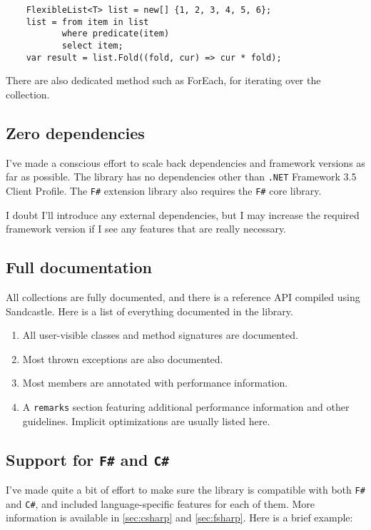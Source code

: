 \documentclass[]{article}
\newcommand{\code}[1]{\mbox{\texttt{#1}}}
\newcommand{\dotnet}{\texttt{.NET}\xspace}
\newcommand{\fsh}{\texttt{F\#}\xspace}
\newcommand{\csh}{\texttt{C\#}\xspace}
\begin{document}
\begin{lstlisting}
	FlexibleList<T> list = new[] {1, 2, 3, 4, 5, 6}; 
	list = from item in list 
		   where predicate(item)
		   select item;
	var result = list.Fold((fold, cur) => cur * fold);
\end{lstlisting}

There are also dedicated method such as ForEach, for iterating over the collection. 

\subsection{Zero dependencies}\label{sec:dependencies}
I've made a conscious effort to scale back dependencies and framework versions as far as possible. The library has no dependencies other than \dotnet Framework 3.5 Client Profile. The \fsh extension library also requires the \fsh core library.

I doubt I'll introduce any external dependencies, but I may increase the required framework version if I see any features that are really necessary.

\subsection{Full documentation}\label{sec:documentation}
All collections are fully documented, and there is a reference API compiled using Sandcastle. Here is a list of everything documented in the library.
\begin{enumerate}
	\item All user-visible classes and method signatures are documented.
	\item Most thrown exceptions are also documented.
	\item Most members are annotated with performance information.
	\item A \code{remarks} section featuring additional performance information and other guidelines. Implicit optimizations are usually listed here.
\end{enumerate}

\subsection{Support for \fsh and \csh}
I've made quite a bit of effort to make sure the library is compatible with both \fsh and \csh, and included language-specific features for each of them. More information is available in \cref{sec:csharp} and \cref{sec:fsharp}. Here is a brief example:
\end{document}
